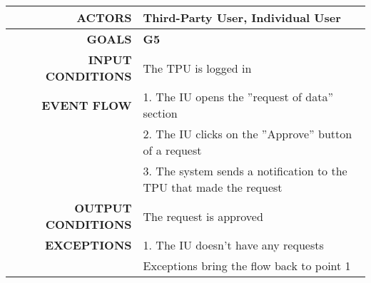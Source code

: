 \begin{table}[h!]
\begin{tabular}{|r|p{3in}|}
\hline
\textbf{ACTORS} & Third-Party User, Individual User\\
\hline
\textbf{GOALS} & \textbf{G5}\\
\hline
\textbf{INPUT CONDITIONS} & The TPU is logged in\\
\hline
\textbf{EVENT FLOW} 
&1. The IU opens the ''request of data'' section \\
&2. The IU clicks on the ''Approve'' button of a request \\
&3. The system sends a notification to the TPU that made the request \\
\hline
\textbf{OUTPUT CONDITIONS} & The request is approved \\
\hline
\textbf{EXCEPTIONS} 
&1. The IU doesn't have any requests \\
&Exceptions bring the flow back to point 1 \\
\hline
\end{tabular}
\end{table}
